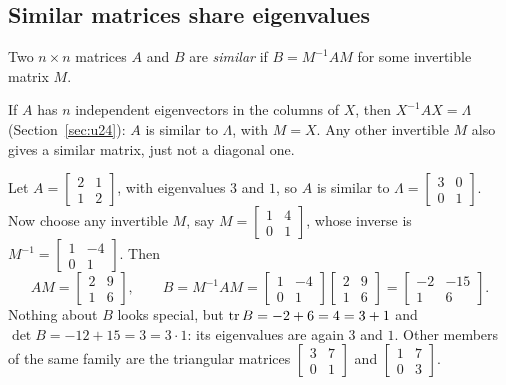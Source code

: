 \subsection{Similar matrices share eigenvalues}

\begin{definition}\label{def:u32-similar}
Two $n\times n$ matrices $A$ and $B$ are \emph{similar} if $B=M^{-1}AM$ for some invertible
matrix $M$.
\end{definition}

If $A$ has $n$ independent eigenvectors in the columns of $X$, then $X^{-1}AX=\Lambda$
(Section~\ref{sec:u24}): $A$ is similar to $\Lambda$, with $M=X$. Any other invertible $M$ also gives
a similar matrix, just not a diagonal one.

\begin{example}\label{ex:u32-family31}
Let $A=\begin{bmatrix}2&1\\1&2\end{bmatrix}$, with eigenvalues $3$ and $1$, so $A$ is similar to
$\Lambda=\left[\begin{smallmatrix}3&0\\0&1\end{smallmatrix}\right]$. Now choose any invertible $M$, say
$M=\left[\begin{smallmatrix}1&4\\0&1\end{smallmatrix}\right]$, whose inverse is
$M^{-1}=\left[\begin{smallmatrix}1&-4\\0&1\end{smallmatrix}\right]$. Then
\[
  AM=\begin{bmatrix}2&9\\1&6\end{bmatrix},\qquad
  B=M^{-1}AM=\begin{bmatrix}1&-4\\0&1\end{bmatrix}\begin{bmatrix}2&9\\1&6\end{bmatrix}
   =\begin{bmatrix}-2&-15\\1&6\end{bmatrix}.
\]
Nothing about $B$ looks special, but $\operatorname{tr} B=-2+6=4=3+1$ and $\det B=-12+15=3=3\cdot1$: its
eigenvalues are again $3$ and $1$. Other members of the same family are the triangular matrices
$\left[\begin{smallmatrix}3&7\\0&1\end{smallmatrix}\right]$ and
$\left[\begin{smallmatrix}1&7\\0&3\end{smallmatrix}\right]$.
\end{example}

